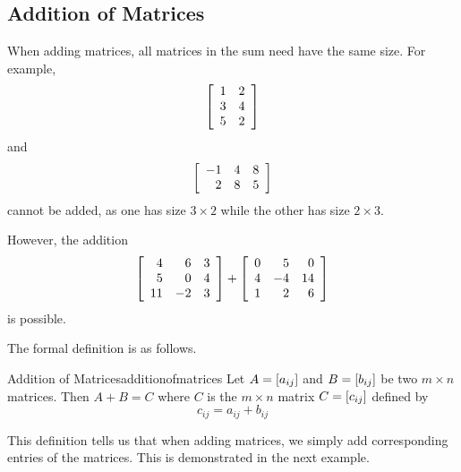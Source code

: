 \subsection{Addition of Matrices}

When adding matrices, all matrices in the sum need have the same size.
For example,
\begin{equation*}
\left[
\begin{array}{rr}
1 & 2 \\
3 & 4 \\
5 & 2
\end{array}
\right] 
\end{equation*}
and
\begin{equation*}
\left[
\begin{array}{rrr}
-1 & 4 & 8\\
2 & 8 & 5
\end{array}
\right] 
\end{equation*}
cannot be added, as one has size $3 \times 2$ while the other has size $2 \times 3$.

However, the addition
\begin{equation*}
\left[
\begin{array}{rrr}
4 & 6 & 3\\
5 & 0 & 4\\
11 & -2 & 3
\end{array}
\right] 
+
\left[
\begin{array}{rrr}
0 & 5 & 0 \\
4 & -4 & 14 \\
1 & 2 & 6
\end{array}
\right]
\end{equation*}
is possible.

The formal definition is as follows.

\begin{definition}{Addition of Matrices}{additionofmatrices}
Let $A=\left[ a_{ij}\right] $ and $B=\left[ b_{ij}\right] $ be two
$m\times n$ matrices. Then $A+B=C$ where $C$ is the $m \times n$
matrix $C=\left[ c_{ij}\right]$ defined by
\begin{equation*}
c_{ij}=a_{ij}+b_{ij}
\end{equation*}

\end{definition}

This definition tells us that when adding matrices, we simply add corresponding entries of the matrices. 
This is demonstrated in the next example. 

